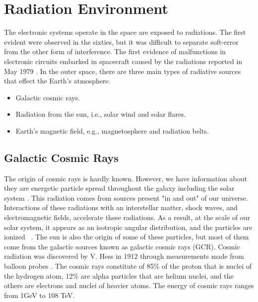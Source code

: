 \section{Radiation Environment}


The electronic systems operate in the space are exposed to radiations. The first evident were observed in the sixties, but it was difficult to separate soft-error from the other form of interference. The first evidence of malfunctions in electronic circuits embarked in spacecraft caused by the radiations reported in May 1979 \citep{may1979alpha}. In the outer space, there are three main types of radiative sources that effect the Earth's atmosphere.

\begin{itemize}

\item Galactic cosmic rays.

\item Radiation from the sun, i.e., solar wind and solar flares.

\item Earth's magnetic field, e.g., magnetosphere and radiation belts.

\end{itemize}


\subsection{Galactic Cosmic Rays} 

The origin of cosmic rays is hardly known. However, we have information about they are energetic particle spread throughout the galaxy including the solar system \citep{SWE20216}. This radiation comes from sources present "in and out" of our
universe. Interactions of these radiations with an interstellar matter, shock waves, and electromagnetic fields, accelerate these radiations. As a result, at the scale of our
solar system, it appears as an isotropic angular distribution, and the particles are ionized~ \citep{SWE20216}. The sun is also the origin of some of these particles, but most of them come from the galactic sources known as galactic cosmic rays (GCR).
Cosmic radiation was discovered by V. Hess in 1912 through measurements made from balloon probes \citep{cronin1999cosmic}. The cosmic rays constitute of 85\% of the proton that is nuclei of the hydrogen atom, 12\% are alpha particles that are helium nuclei, and the others are electrons and nuclei of heavier atoms. The energy of cosmic rays ranges from 1GeV to 108 TeV. 


